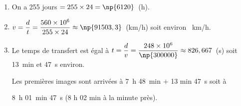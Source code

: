 
\medskip

% 
%
 
\begin{enumerate}
\item %
On a 255 jours $ = 255 \times 24 = \np{6120}$~(h). 
\item %
$v = \dfrac{d}{t}  =  \dfrac{560 \times 10^6}{255 \times 24} \approx \np{91503,3}$~(km/h) soit environ ~km/h. 
\item %

% 
% 
% 
Le temps de transfert est égal à  $t = \dfrac{d}{v} = \dfrac{248 \times 10^6}{\np{300000}} \approx 826,667$~(s) soit 13~min et 47~s environ.

Les premières images sont arrivées à 7~h 48~min $+$ 13 min 47~s soit à 

8~h 01~min 47~s (8 h 02 min à la minute près).
\end{enumerate}

%
